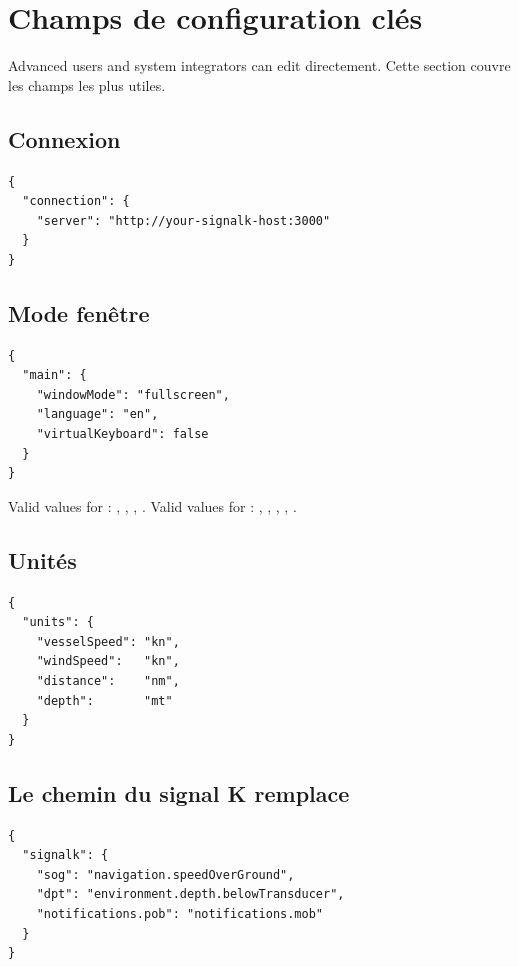 \section{Champs de configuration clés}
\label{app:config}

Advanced users and system integrators can edit 
directement.
Cette section couvre les champs les plus utiles.

\subsection{Connexion}

\begin{lstlisting}
{
  "connection": {
    "server": "http://your-signalk-host:3000"
  }
}
\end{lstlisting}

\subsection{Mode fenêtre}

\begin{lstlisting}
{
  "main": {
    "windowMode": "fullscreen",
    "language": "en",
    "virtualKeyboard": false
  }
}
\end{lstlisting}

Valid values for : , ,
, .
Valid values for : , , ,
, .

\subsection{Unités}

\begin{lstlisting}
{
  "units": {
    "vesselSpeed": "kn",
    "windSpeed":   "kn",
    "distance":    "nm",
    "depth":       "mt"
  }
}
\end{lstlisting}

\subsection{Le chemin du signal K remplace}

\begin{lstlisting}
{
  "signalk": {
    "sog": "navigation.speedOverGround",
    "dpt": "environment.depth.belowTransducer",
    "notifications.pob": "notifications.mob"
  }
}
\end{lstlisting}

